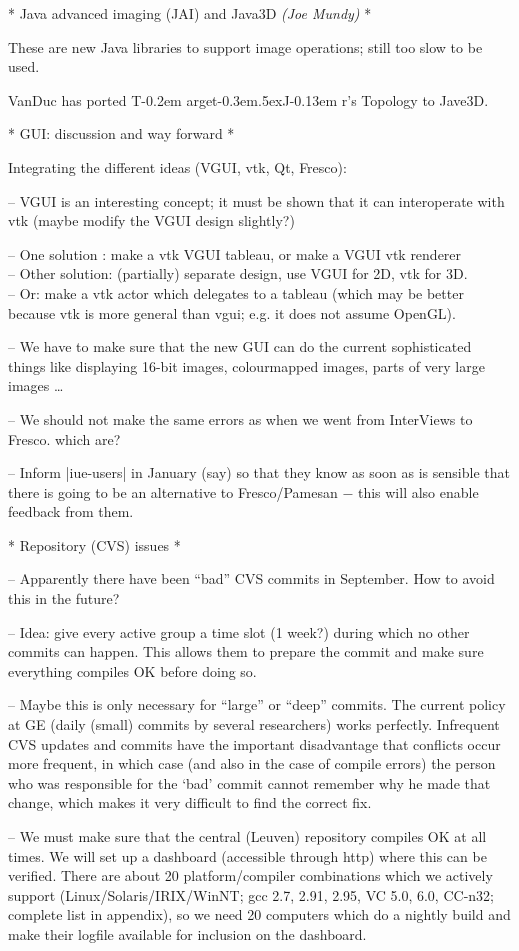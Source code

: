 \documentclass[11pt]{article}
\def\TargetJr{{T\kern-0.2em arget\kern-0.3em\lower.5ex\hbox{\Large J}\kern-0.13em r}}
\def\by#1.{{\normalsize\sf\it(#1)}}\relax
\begin{document}
* Java advanced imaging (JAI) and Java3D \by Joe Mundy. *

These are new Java libraries to support image operations;
still too slow to be used.

VanDuc has ported \TargetJr's Topology to Jave3D.


* GUI: discussion and way forward *

Integrating the different ideas (VGUI, vtk, Qt, Fresco):

-- VGUI is an interesting concept;
it must be shown that it can interoperate with vtk (maybe modify the VGUI
design slightly?)

-- One solution : make a vtk VGUI tableau, or make a VGUI vtk renderer \\
-- Other solution: (partially) separate design, use VGUI for 2D, vtk for 3D. \\
-- Or: make a vtk actor which delegates to a tableau (which may be better
   because vtk is more general than vgui; e.g. it does not assume OpenGL).

-- We have to make sure that the new GUI can do the current sophisticated things
like displaying 16-bit images, colourmapped images, parts of very large images \ldots

-- We should not make the same errors as when we went from InterViews to Fresco.
which are?

-- Inform |iue-users| in January (say) so that they know as soon as is sensible
that there is going to be an alternative to Fresco/Pamesan $-$ this will also
enable feedback from them.

* Repository (CVS) issues *

-- Apparently there have been ``bad'' CVS commits in September.
How to avoid this in the future?

-- Idea: give every active group a time slot (1 week?) during which no other
commits can happen.  This allows them to prepare the commit and make sure
everything compiles OK before doing so.

-- Maybe this is only necessary for ``large'' or ``deep'' commits.  The current
policy at GE (daily (small) commits by several researchers) works perfectly.
Infrequent CVS updates and commits have the important disadvantage that
conflicts occur more frequent, in which case (and also in the case of compile
errors) the person who was responsible for the `bad' commit cannot remember
why he made that change, which makes it very difficult to find the correct fix.

-- We must make sure that the central (Leuven) repository compiles OK at all
times.  We will set up a dashboard (accessible through http) where this can
be verified.  There are about 20 platform/compiler combinations which we
actively support (Linux/Solaris/IRIX/WinNT; gcc 2.7, 2.91, 2.95, VC 5.0, 6.0,
CC-n32; complete list in appendix), so we need 20 computers which do a nightly
build and make their logfile available for inclusion on the dashboard.
\end{document}
